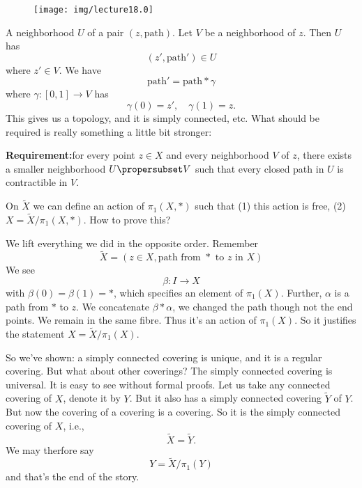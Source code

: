 \begin{wrapfigure}{l}{1in}
  \vspace{-12pt}
  \centering
  \texttt{[image: img/lecture18.0]}
\end{wrapfigure}
\noindent\ignorespaces %
A neighborhood $U$ of a pair $(z,\mbox{path})$. Let $V$ be a
neighborhood of $z$. Then $U$ has
\begin{equation}
(z',\mbox{path}')\in U
\end{equation}
where $z'\in V$. We have
\begin{equation}
\mbox{path}'=\mbox{path}*\gamma
\end{equation}
where $\gamma\colon[0,1]\to V$ has
\begin{equation}
\gamma(0)=z',\quad\gamma(1)=z.
\end{equation}
This gives us a topology, and it is simply connected, etc. What
should be required is really something a little bit stronger:

\medbreak
\noindent\textbf{Requirement:\quad}for every point $z\in X$ and
every neighborhood $V$ of $z$, there exists a smaller
neighborhood $U\propersubset V$ such that every closed path in
$U$ is contractible in $V$.

\medbreak
\noindent\ignorespaces %
On $\widetilde{X}$ we can define an action of $\pi_{1}(X,*)$ such
that (1) this action is free, (2)
$X=\widetilde{X}/\pi_{1}(X,*)$. How to prove this?

We lift everything we did in the opposite order. Remember
\begin{equation}
\widetilde{X}=(z\in X,\mbox{path from $*$ to $z$ in $X$})
\end{equation}
We see
\begin{equation}
\beta\colon I\to X
\end{equation}
with $\beta(0)=\beta(1)=*$, which specifies an element of
$\pi_{1}(X)$. Further, $\alpha$ is a path from $*$ to $z$. We
concatenate $\beta*\alpha$, we changed the path though not the
end points. We remain in the same fibre. Thus it's an action of $\pi_{1}(X)$.
So it justifies the statement $X=\widetilde{X}/\pi_{1}(X)$.

So we've shown: a simply connected covering is unique, and it is
a regular covering. But what about other coverings? The simply
connected covering is universal. It is easy to see without formal
proofs. Let us take any connected covering of $X$, denote it by
$Y$. But it also has a simply connected covering $\widetilde{Y}$
of $Y$. But now the covering of a covering is a covering. So it
is the simply connected covering of $X$, i.e.,
\begin{equation}
\widetilde{X}=\widetilde{Y}.
\end{equation}
We may therfore say
\begin{equation}
Y=\widetilde{X}/\pi_{1}(Y)
\end{equation}
and that's the end of the story.

